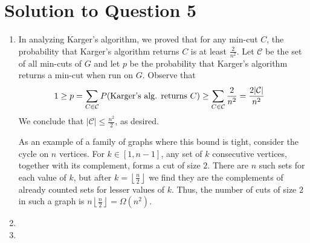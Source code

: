 \documentclass[11pt]{article}
\begin{document}
\newpage
\section{Solution to Question 5}

\begin{enumerate}
  \item In analyzing Karger's algorithm, we proved that for any min-cut $C$, the probability that Karger's algorithm returns $C$ is at least $\frac{2}{n^2}$.
    Let $\mathcal{C}$ be the set of all min-cuts of $G$ and let $p$ be the probability that Karger's algorithm returns a min-cut when run on $G$.
    Observe that
    \begin{align*}
    1 \geq p &= \sum_{C \in \mathcal{C}} P(\textnormal{Karger's alg. returns } C) \geq \sum_{C \in \mathcal{C}}\frac{2}{n^2} = \frac{2|\mathcal{C}|}{n^2}
    \end{align*}
    We conclude that $|\mathcal{C}| \leq \frac{n^2}{2}$, as desired.

    As an example of a family of graphs where this bound is tight, consider the cycle on $n$ vertices.
    For $k \in [1, n-1]$, any set of $k$ consecutive vertices, together with its complement, forms a cut of size $2$.
    There are $n$ such sets for each value of $k$, but after $k = \left\lfloor\frac{n}{2}\right\rfloor$ we find they are the complements of already counted sets for lesser values of $k$.
    Thus, the number of cuts of size $2$ in such a graph is $n\left\lfloor\frac{n}{2}\right\rfloor = \Omega(n^2)$.
  \item 
  \item
\end{enumerate}
\end{document}

